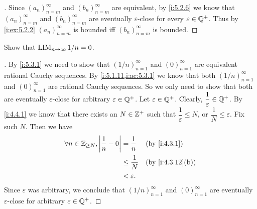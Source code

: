 \begin{proof}[]
  Since \((a_n)_{n = m}^{\infty}\) and \((b_n)_{n = m}^{\infty}\) are equivalent, by \cref{i:5.2.6} we know that \((a_n)_{n = m}^{\infty}\) and \((b_n)_{n = m}^{\infty}\) are eventually \(\varepsilon\)-close for every \(\varepsilon \in \mathbb{Q}^+\).
  Thus by \cref{i:ex:5.2.2} \((a_n)_{n = m}^{\infty}\) is bounded iff \((b_n)_{n = m}^{\infty}\) is bounded.
\end{proof}

\begin{ex}\label{i:ex:5.3.5}
  Show that \(\operatorname*{LIM}_{n \to \infty} 1 / n = 0\).
\end{ex}

\begin{proof}[]
  By \cref{i:5.3.1} we need to show that \((1 / n)_{n = 1}^\infty\) and \((0)_{n = 1}^\infty\) are equivalent rational Cauchy sequences.
  By \cref{i:5.1.11,i:ac:5.3.1} we know that both \((1/ n)_{n = 1}^{\infty}\) and \((0)_{n = 1}^\infty\) are rational Cauchy sequences.
  So we only need to show that both are eventually \(\varepsilon\)-close for arbitrary \(\varepsilon \in \mathbb{Q}^+\).
  Let \(\varepsilon \in \mathbb{Q}^+\).
  Clearly, \(\dfrac{1}{\varepsilon} \in \mathbb{Q}^+\).
  By \cref{i:4.4.1} we know that there exists an \(N \in \mathbb{Z}^+\) such that \(\dfrac{1}{\varepsilon} \leq N\), or \(\dfrac{1}{N} \leq \varepsilon\).
  Fix such \(N\).
  Then we have
  \begin{align*}
    \forall n \in \Z_{\geq N}, \abs{\dfrac{1}{n} - 0} & = \dfrac{1}{n}    &  & \by{i:4.3.1}     \\
                                                      & \leq \dfrac{1}{N} &  & \by{i:4.3.12}[b] \\
                                                      & < \varepsilon.
  \end{align*}
  Since \(\varepsilon\) was arbitrary, we conclude that \((1 / n)_{n = 1}^\infty\) and \((0)_{n = 1}^\infty\) are eventually \(\varepsilon\)-close for arbitrary \(\varepsilon \in \mathbb{Q}^+\).
\end{proof}
